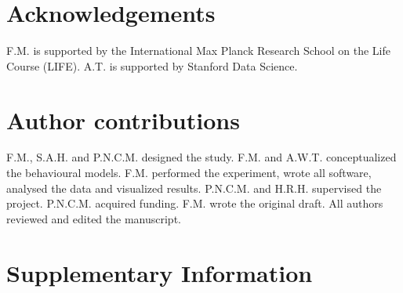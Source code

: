 \documentclass[11pt, a4paper]{article}
\begin{document}
\section*{Acknowledgements}
F.M. is supported by the International Max Planck Research School on the Life Course (LIFE). A.T. is supported by Stanford Data Science.

\section*{Author contributions}
F.M., S.A.H. and P.N.C.M. designed the study. F.M. and A.W.T. conceptualized the behavioural models. F.M. performed the experiment, wrote all software, analysed the data and visualized results. P.N.C.M. and H.R.H. supervised the project. P.N.C.M. acquired funding. F.M. wrote the original draft. All authors reviewed and edited the manuscript.

\renewcommand*{\bibfont}{\small}
\printbibliography
\newpage

\section*{Supplementary Information}
\label{sec:supplement}
\end{document}
